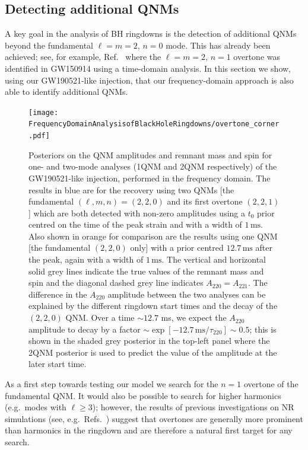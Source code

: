 \subsection{Detecting additional QNMs}\label{subsec:overtones}

A key goal in the analysis of BH ringdowns is the detection of additional QNMs beyond the fundamental $\ell=m=2$, $n=0$ mode.
This has already been achieved; see, for example, Ref.~\cite{Isi:2019aib} where the $\ell=m=2$, $n=1$ overtone was identified in GW150914 using a time-domain analysis.
In this section we show, using our GW190521-like injection, that our frequency-domain approach is also able to identify additional QNMs.

\begin{figure}
    \centering
    \texttt{[image: FrequencyDomainAnalysisofBlackHoleRingdowns/overtone\_corner.pdf]}
    \caption[Posteriors on the remnant mass and spin and on the quasinormal-mode amplitudes for a GW190521-like injection analysed with and without an overtone]{ 
    Posteriors on the QNM amplitudes and remnant mass and spin for one- and two-mode analyses (1QNM and 2QNM respectively) of the GW190521-like injection, performed in the frequency domain.
    The results in blue are for the recovery using two QNMs [the fundamental $(\ell,m,n)=(2,2,0)$ and its first overtone $(2,2,1)$] which are both detected with non-zero amplitudes using a $t_0$ prior centred on the time of the peak strain and with a width of $1\,\mathrm{ms}$.
    Also shown in orange for comparison are the results using one QNM [the fundamental $(2,2,0)$ only] with a prior centred $12.7\,\mathrm{ms}$ after the peak, again with a width of $1\,\mathrm{ms}$.
    The vertical and horizontal solid grey lines indicate the true values of the remnant mass and spin and the diagonal dashed grey line indicates $A_{220}=A_{221}$.
    The difference in the $A_{220}$ amplitude between the two analyses can be explained by the different ringdown start times and the decay of the $(2,2,0)$ QNM.
    Over a time $\sim 12.7$ ms, we expect the $A_{220}$ amplitude to decay by a factor $\sim \exp[-12.7\,\mathrm{ms}/\tau_{220}] \sim 0.5$; this is shown in the shaded grey posterior in the top-left panel where the 2QNM posterior is used to predict the value of the amplitude at the later start time.
    }
    \label{fig:overtone_corner}
\end{figure}

As a first step towards testing our model we search for the $n=1$ overtone of the fundamental QNM.
It would also be possible to search for higher harmonics (e.g.\ modes with $\ell\geq 3$); however, the results of previous investigations on NR simulations (see, e.g.\ Refs.~\cite{Giesler:2019uxc, Ota:2019bzl, Dhani:2020nik, Finch:2021iip}) suggest that overtones are generally more prominent than harmonics in the ringdown and are therefore a natural first target for any search.

